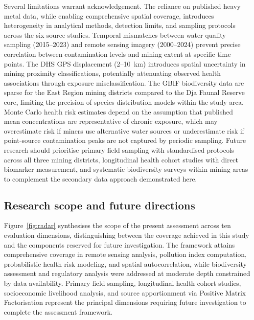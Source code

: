 \documentclass[preprint,12pt,number]{elsarticle}
\begin{document}
Several limitations warrant acknowledgement. The reliance on published heavy metal data, while enabling comprehensive spatial coverage, introduces heterogeneity in analytical methods, detection limits, and sampling protocols across the six source studies. Temporal mismatches between water quality sampling (2015--2023) and remote sensing imagery (2000--2024) prevent precise correlation between contamination levels and mining extent at specific time points. The DHS GPS displacement (2--10~km) introduces spatial uncertainty in mining proximity classifications, potentially attenuating observed health associations through exposure misclassification. The GBIF biodiversity data are sparse for the East Region mining districts compared to the Dja Faunal Reserve core, limiting the precision of species distribution models within the study area. Monte Carlo health risk estimates depend on the assumption that published mean concentrations are representative of chronic exposure, which may overestimate risk if miners use alternative water sources or underestimate risk if point-source contamination peaks are not captured by periodic sampling. Future research should prioritise primary field sampling with standardised protocols across all three mining districts, longitudinal health cohort studies with direct biomarker measurement, and systematic biodiversity surveys within mining areas to complement the secondary data approach demonstrated here.


\subsection{Research scope and future directions}

Figure~\ref{fig:radar} synthesises the scope of the present assessment across ten evaluation dimensions, distinguishing between the coverage achieved in this study and the components reserved for future investigation. The framework attains comprehensive coverage in remote sensing analysis, pollution index computation, probabilistic health risk modeling, and spatial autocorrelation, while biodiversity assessment and regulatory analysis were addressed at moderate depth constrained by data availability. Primary field sampling, longitudinal health cohort studies, socioeconomic livelihood analysis, and source apportionment via Positive Matrix Factorisation represent the principal dimensions requiring future investigation to complete the assessment framework.
\end{document}
